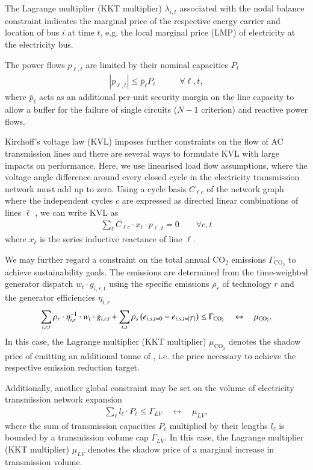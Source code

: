 The Lagrange multiplier (KKT multiplier) $\lambda_{i,t}$ associated with the
nodal balance constraint indicates the marginal price of the respective energy
carrier and location of bus $i$ at time $t$, e.g. the local marginal price (LMP)
of electricity at the electricity bus.

The power flows $p_{\ell,t}$ are limited by their nominal capacities $P_\ell$
\begin{align}
	|p_{\ell,t}| \leq \overline{p}_{\ell} P_{\ell} & \qquad\forall \ell, t,
	\label{eq:cap}
\end{align}
where $\overline{p}_\ell$ acts as an additional per-unit security margin on the line capacity
to allow a buffer for the failure of single circuits ($N-1$ criterion) and reactive power flows.

Kirchoff's voltage law (KVL) imposes further constraints on the flow of AC
transmission lines and there are several ways to formulate KVL with large
impacts on performance. Here, we use linearised load flow assumptions, where the
voltage angle difference around every closed cycle in the electricity
transmission network must add up to zero. Using a cycle basis $C_{\ell c}$ of
the network graph where the independent cycles $c$ are expressed as directed
linear combinations of lines $\ell$ , we can write
KVL as
\begin{align}
    \sum_\ell C_{\ell c} \cdot x_\ell \cdot p_{\ell,t} = 0 \qquad\forall c,t
    \label{eq:kvl}
\end{align}
where $x_\ell$ is the series inductive reactance of line $\ell$.

We may further regard a constraint on the total annual CO$_2$ emissions $\Gamma_{\text{CO}_2}$
to achieve sustainability goals.
The emissions are determined from the time-weighted generator dispatch $ w_t \cdot g_{i,r,t}$ using the specific emissions $\rho_r$ of technology $r$
and the generator efficiencies $\eta_{i,r}$
\begin{align}
	\sum_{i,r,t}  \rho_r \cdot \eta_{i,r}^{-1} \cdot w_t \cdot g_{i,r,t} + \sum_{i,s} \rho_s \left(e_{i,s,t=0} - e_{i,s,t=\left|\mathcal{T}\right|}\right) \leq \Gamma_{\text{CO}_2}  \quad \leftrightarrow \quad \mu_{\text{CO}_2}.
\end{align}
In this case, the Lagrange multiplier (KKT multiplier) $\mu_{\text{CO}_2}$ denotes the shadow price of emitting an additional tonne of \co, i.e. the \co price necessary to achieve the respective \co emission reduction target.

Additionally, another global constraint may be set on the volume of electricity transmission network expansion
\begin{align}
    \sum_\ell l_\ell \cdot P_\ell \leq \Gamma_{LV} \quad \leftrightarrow \quad \mu_{LV},
\end{align}
where the sum of transmission capacities $P_\ell$ multiplied by their lengths $l_\ell$ is bounded by a transmission volume cap
$\Gamma_{LV}$. In this case, the Lagrange multiplier (KKT multiplier) $\mu_{LV}$ denotes the shadow price of a marginal increase in transmission volume.

